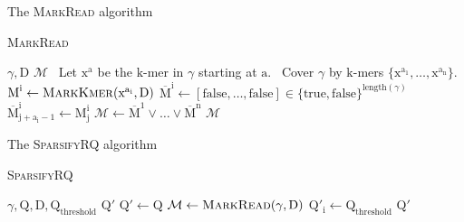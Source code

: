 \documentclass[12pt]{beamer}
\begin{document}
    \begin{frame}{The \textsc{MarkRead} algorithm}
        \begin{algorithm}[H]
	    \caption{\textsc{MarkRead}}
	    \begin{algorithmic}[1]
                \REQUIRE \(\gamma, \text{D}\)
                \ENSURE \(\mathcal{M}\)
		\STATE \, \COMMENT Let \(\text{x}^\text{a}\) be the \(\text{k}\)-mer in \(\gamma\) starting at \(\text{a}\).
                \STATE \, \COMMENT Cover \(\gamma\) by \(\text{k}\)-mers \(\{\text{x}^{\text{a}_\text{1}},\dots,\text{x}^{\text{a}_\text{n}}\}\).
		    \STATE \(\text{M}^\text{i} \leftarrow \text{\textsc{MarkKmer}}(\text{x}^{\text{a}_\text{i}},\text{D})\)
                    \STATE \(\overline{\text{M}}^\text{i} \leftarrow [\text{false},\dots,\text{false}]\in \{\text{true},\text{false}\}^{\text{length}(\gamma)}\)
		        \STATE \(\overline{\text{M}}^{\text{i}}_{\text{j}+\text{a}_\text{i}-1} \leftarrow \text{M}^\text{i}_\text{j}\)
		    \ENDFOR
                \ENDFOR
		\STATE \(\mathcal{M} \leftarrow \overline{\text{M}}^1 \lor \dots \lor \overline{\text{M}}^\text{n}\)
		\RETURN \(\mathcal{M}\)
	    \end{algorithmic}
	\end{algorithm}
    \end{frame}

    \begin{frame}{The \textsc{SparsifyRQ} algorithm}
        \begin{algorithm}[H]
	    \caption{\textsc{SparsifyRQ}}
	    \begin{algorithmic}[1]
                \REQUIRE \(\gamma,\text{Q},\text{D},\text{Q}_{\text{threshold}}\)
		\ENSURE \(\text{Q}'\)
		\STATE \(\text{Q}' \leftarrow \text{Q}\)
		\STATE \(\mathcal{M} \leftarrow \text{\textsc{MarkRead}}(\gamma, \text{D})\)
		        \STATE \(\text{Q}'_\text{i} \leftarrow \text{Q}_{\text{threshold}}\)
		    \ENDIF
		\ENDFOR
		\RETURN \(\text{Q}'\)
	    \end{algorithmic}
	\end{algorithm}
    \end{frame}
\end{document}
